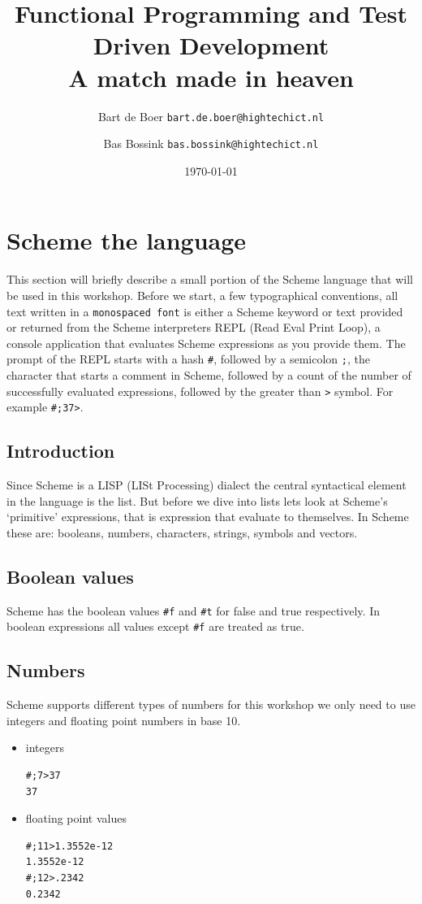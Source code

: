 \documentclass[12pt,a4paper,english,twoside]{article}
\author{
    Bart de Boer \texttt{bart.de.boer@hightechict.nl}
    \and
    Bas Bossink \texttt{bas.bossink@hightechict.nl}
}
\date{\today}
\title{Functional Programming and Test Driven Development\\
\vspace{2 mm} {\large A match made in heaven}}
\begin{document}
\maketitle
\section{Scheme the language}
This section will briefly describe a small portion of the Scheme language that 
will be used in this workshop.
Before we start, a few typographical conventions, all text written in a 
\texttt{monospaced font} is either a Scheme keyword or text provided or 
returned from the Scheme interpreters REPL (Read Eval Print Loop), a console 
application that evaluates Scheme expressions as you provide them. The prompt 
of the REPL starts with a hash \texttt{\#}, followed by a semicolon \texttt{;}, the 
character that starts a comment in Scheme, followed by a count of the number 
of successfully evaluated expressions, followed by the greater than \texttt{>} 
symbol. For example \texttt{\#;37>}.
\subsection{Introduction}
Since Scheme is a LISP (LISt Processing) dialect the central syntactical 
element in the language is the list. But before we dive into lists lets look 
at Scheme's `primitive' expressions, that is expression that evaluate to 
themselves. In Scheme these are: booleans, numbers, characters, strings, 
symbols and vectors.
\subsection{Boolean values}
Scheme has the boolean values \texttt{\#f} and \texttt{\#t} for false and true 
respectively. In boolean expressions all values except \texttt{\#f} are 
treated as true.
\subsection{Numbers}
Scheme supports different types of numbers for this workshop we only need to 
use integers and floating point numbers in base 10.
\begin{itemize}
\item integers 
\begin{lstlisting}
#;7>37
37
\end{lstlisting}
\item floating point values
\begin{lstlisting}
#;11>1.3552e-12
1.3552e-12 
#;12>.2342
0.2342
\end{lstlisting}
\end{itemize}
\end{document}

